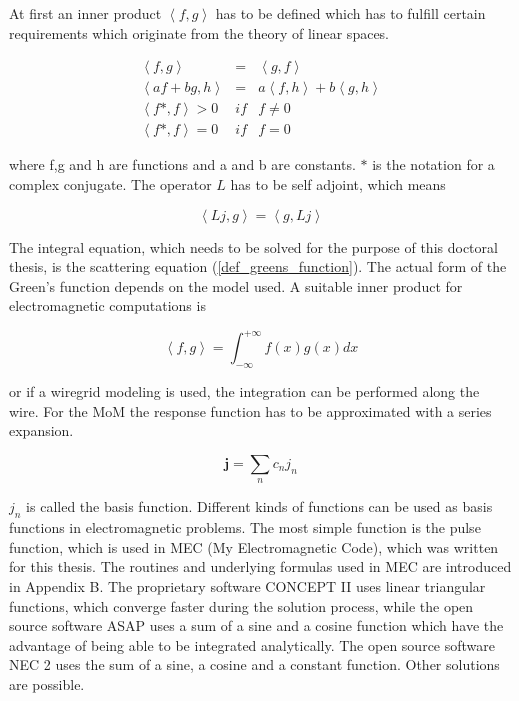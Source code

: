 \documentclass[a4paper,11pt]{thesis}
\begin{document}
At first an inner product $\left\langle f,g\right\rangle$ has to be defined which has to fulfill certain requirements which originate from the theory of linear spaces.

\begin{eqnarray}
 \left\langle f,g\right\rangle &=& \left\langle g,f\right\rangle \\
 \left\langle af+ bg,h\right\rangle &=& a\left\langle f,h\right\rangle + b\left\langle g,h\right\rangle\\
 \left\langle f*,f\right\rangle >0 &if& f\neq0  \\
 \left\langle f*,f\right\rangle =0 &if& f=0
\end{eqnarray}

where f,g and h are functions and a and b are constants. $*$ is the notation for a complex conjugate. The operator $L$ has to be self adjoint, which means

\begin{equation}
 \left\langle Lj,g \right\rangle = \left\langle g,Lj \right\rangle
\end{equation}


The integral equation, which needs to be solved for the purpose of this doctoral thesis, is the scattering equation (\ref{def_greens_function}). The actual form of the Green's function depends on the model used. A suitable inner product for electromagnetic computations is

\begin{equation}
 \left\langle f,g \right\rangle = \int_{-\infty}^{+\infty} f(x)g(x) dx
\end{equation}

or if a wiregrid modeling is used, the integration can be performed along the wire. For the MoM the response function has to be approximated with a series expansion.

\begin{equation}\label{eq:bas_funct_expans}
 \mathbf{j}=\sum_{n} c_n j_n
\end{equation}

$j_n$ is called the basis function. Different kinds of functions can be used as basis functions in electromagnetic problems. The most simple function is the pulse function, which is used in MEC (My Electromagnetic Code), which was written for this thesis. The routines and underlying formulas used in MEC are introduced in Appendix B. The proprietary software CONCEPT II uses linear triangular functions, which converge faster during the solution process, while the open source software ASAP uses a sum of a sine and a cosine function which have the advantage of being able to be integrated analytically. The open source software NEC 2 uses the sum of a sine, a cosine and a constant function. Other solutions are possible.\\
\end{document}
